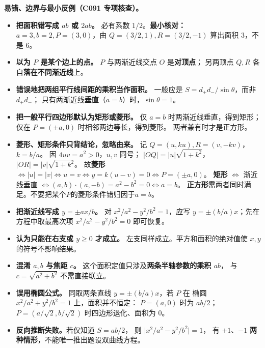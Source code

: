 \clearpage
\begin{trapbox}
\textbf{易错、边界与最小反例（C091 专项核查）。}
\begin{itemize}
\item \textbf{把面积错写成 $ab$ 或 $2ab$。}
必有系数 $\boxed{1/2}$。\textbf{最小核对：}
$a=3,b=2,P=(3,0)$，由 $Q=(3/2,1),R=(3/2,-1)$ 算出面积 $3$，不是 $6$。

\item \textbf{以为 $P$ 是某个边上的点。}
$P$ 与两渐近线交点 $O$ 是\textbf{对顶点}；
另两顶点 $Q,R$ 各自\textbf{落在不同渐近线}上。

\item \textbf{错误地把两组平行线间距的乘积当作面积。}
一般应是 $S=d_+d_-/\sin\theta$，而非 $d_+d_-$；
只有两渐近线\textbf{垂直}（$a=b$）时，$\sin\theta=1$。

\item \textbf{把一般平行四边形默认为矩形或菱形。}
仅 $a=b$ 时两渐近线垂直，得到矩形；
仅在 $P=(\pm a,0)$ 时相邻两边等长，得到菱形。
两者兼有时才是正方形。

\item \textbf{菱形、矩形条件只背结论，忽略由来。}
记 $Q=(u,ku),R=(v,-kv)$，$k=b/a$。
因 $4uv=a^2>0$，$u,v$ 同号；
$|OQ|=|u|\sqrt{1+k^2}$，$|OR|=|v|\sqrt{1+k^2}$。
故\textbf{菱形} $\Leftrightarrow|u|=|v|\Leftrightarrow u=v
\Leftrightarrow y=k(u-v)=0\Leftrightarrow P=(\pm a,0)$。
\textbf{矩形} $\Leftrightarrow$ 渐近线垂直 $\Leftrightarrow
(a,b)\cdot(a,-b)=a^2-b^2=0\Leftrightarrow a=b$。
\textbf{正方形}需两者同时满足。不要把某个$P$的菱形条件错归因于$a=b$。

\item \textbf{把渐近线写成 $y=\pm a x/b$。}
对 $x^2/a^2-y^2/b^2=1$，应写
$\boxed{y=\pm (b/a)x}$；先在方程中取最高次项 $x^2/a^2-y^2/b^2=0$ 即可恢复。

\item \textbf{认为只能在右支或 $y\ge0$ 才成立。}
左支同样成立。平方和面积的绝对值使 $x,y$ 的符号不影响结果。

\item \textbf{混淆 $a,b$ 与焦距 $c$。}
这个面积定值只涉及\textbf{两条半轴参数的乘积 $ab$}，
与 $c=\sqrt{a^2+b^2}$ 不需直接联立。

\item \textbf{误用椭圆公式。}
同取两条直线 $y=\pm(b/a)x$，若 $P$ 在
椭圆 $x^2/a^2+y^2/b^2=1$ 上，面积并不恒定：
$P=(a,0)$ 时为 $ab/2$；$P=(a/\sqrt2,b/\sqrt2)$ 时四边形退化、面积为 $0$。

\item \textbf{反向推断失败。}若仅知道 $S=ab/2$，
则 $\bigl|x^2/a^2-y^2/b^2\bigr|=1$，
有 $+1$、$-1$ \textbf{两种情形}，不能唯一推出题设双曲线方程。


\end{itemize}
\end{trapbox}
